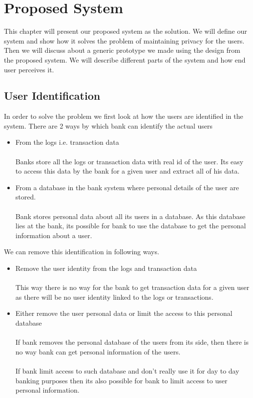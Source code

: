 \chapter{Proposed System}

This chapter will present our proposed system as the solution. We will define our system and show how it solves the problem of maintaining privacy for the users. Then we will discuss about a generic prototype we made using the design from the proposed system. We will describe different parts of the system and how end user perceives it.
\section{User Identification}
In order to solve the problem we first look at how the users are identified in the system. There are 2 ways by which bank can identify the actual users
\begin{itemize}
	\item From the logs i.e. transaction data
\\
\\Banks store all the logs or transaction data with real id of the user. Its easy to access this data by the bank for a given user and extract all of his data.
	\item From a database in the bank system where personal details of the user are stored.	
\\
\\Bank stores personal data about all its users in a database. As this database lies at the bank, its possible for bank to use the database to get the personal information about a user.
\end{itemize}
We can remove this identification in following ways.
\begin{itemize}
	\item Remove the user identity from the logs and transaction data
\\
\\This way there is no way for the bank to get transaction data for a given user as there will be no user identity linked to the logs or transactions.
	\item Either remove the user personal data or limit the access to this personal database
\\
\\If bank removes the personal database of the users from its side, then there is no way bank can get personal information of the users.
\\
\\If bank limit access to such database and don't really use it for day to day banking purposes then its also possible for bank to limit access to user personal information.
\end{itemize}
